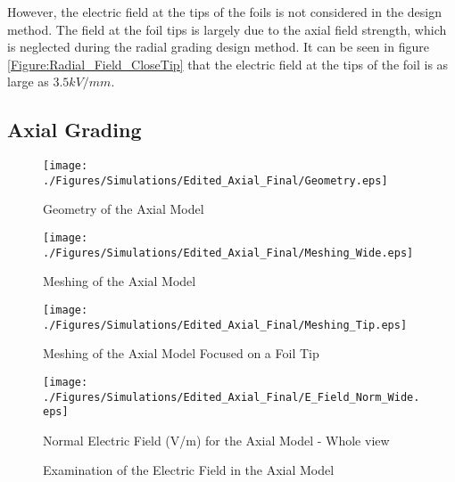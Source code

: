 However, the electric field at the tips of the foils is not considered in the design method.
The field at the foil tips is largely due to the axial field strength, which is neglected during the radial grading design method.
It can be seen in figure \ref{Figure:Radial_Field_CloseTip} that the electric field at the tips of the foil is as large as $3.5kV/mm$.


\subsection{Axial Grading}
\begin{figure}[!h]
  \centering
    \texttt{[image: ./Figures/Simulations/Edited\_Axial\_Final/Geometry.eps]} 
	\caption{Geometry of the Axial Model}
	\label{Figure:Axial_Geom}
\end{figure}

\begin{figure}[!h]
  \centering
    \texttt{[image: ./Figures/Simulations/Edited\_Axial\_Final/Meshing\_Wide.eps]} 
	\caption{Meshing of the Axial Model}
	\label{Figure:Axial_Mesh_wide}
\end{figure}

\begin{figure}[!h]
  \centering
    \texttt{[image: ./Figures/Simulations/Edited\_Axial\_Final/Meshing\_Tip.eps]} 
	\caption{Meshing of the Axial Model Focused on a Foil Tip}
	\label{Figure:Axial_Mesh_close}
\end{figure}

\begin{figure}[!h]
  \centering
    \texttt{[image: ./Figures/Simulations/Edited\_Axial\_Final/E\_Field\_Norm\_Wide.eps]} 
	\caption{Normal Electric Field (V/m) for the Axial Model - Whole view}
	\label{Figure:Radial_Field_Wide}
   \end{figure}

\begin{figure}[!h]
  \centering
{} 
\caption{Examination of the Electric Field in the Axial Model}
\label{Figure:No_Grading_Field}
\end{figure}

